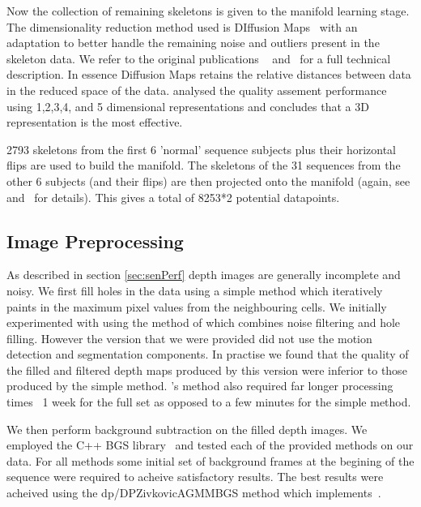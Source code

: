 \documentclass[11pt]{article} %
\begin{document}
Now the collection of remaining skeletons is given to the manifold learning stage. The dimensionality reduction method used is DIffusion Maps~\cite{Coifman2006} with an adaptation to better handle the remaining noise and outliers present in the skeleton data. We refer to the original publications ~\cite{Paiement} and~\cite{Tao} for a full technical description. In essence Diffusion Maps retains the relative distances between data in the reduced space of the data. \cite{Tao} analysed the quality assement performance using 1,2,3,4, and 5 dimensional representations and concludes that a 3D representation is the most effective.

2793 skeletons from the first 6 'normal' sequence subjects plus their horizontal flips are used to build the manifold. The skeletons of the 31 sequences from the other 6 subjects (and their flips) are then projected onto the manifold (again, see \cite{Paiement} and~\cite{Tao} for details). This gives a total of 8253*2 potential datapoints.


\subsection{Image Preprocessing}

As described in section \ref{sec:senPerf} depth images are generally incomplete and noisy. We first fill holes in the data using a simple method which iteratively paints in the maximum pixel values from the neighbouring cells. We initially experimented with using the method of \cite{Camplani2012a} which combines noise filtering and hole filling. However the version that we were provided did not use the motion detection and segmentation components. In practise we found that the quality of the filled and filtered depth maps produced by this version were inferior to those produced by the simple method.  \cite{Camplani2012a}'s method also required far longer processing times ~1 week for the full set as opposed to a few minutes for the simple method. 

We then perform background subtraction on the filled depth images. We employed the C++ BGS library~\cite{bgslibrary} and tested each of the provided methods on our data. For all methods some initial set of background frames at the begining of the sequence were required to acheive satisfactory results. The best results were acheived using the dp/DPZivkovicAGMMBGS method which implements~\cite{Zivkovic2004}.
\end{document}
